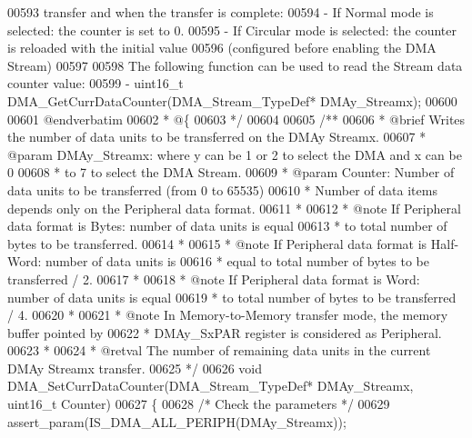 \begin{DoxyCode}
00593 \textcolor{comment}{  transfer and when the transfer is complete: }
00594 \textcolor{comment}{   - If Normal mode is selected: the counter is set to 0.}
00595 \textcolor{comment}{   - If Circular mode is selected: the counter is reloaded with the initial value}
00596 \textcolor{comment}{     (configured before enabling the DMA Stream)}
00597 \textcolor{comment}{   }
00598 \textcolor{comment}{  The following function can be used to read the Stream data counter value:}
00599 \textcolor{comment}{     - uint16\_t DMA\_GetCurrDataCounter(DMA\_Stream\_TypeDef* DMAy\_Streamx);}
00600 \textcolor{comment}{}
00601 \textcolor{comment}{@endverbatim}
00602 \textcolor{comment}{  * @\{}
00603 \textcolor{comment}{  */}
00604 
00605 \textcolor{comment}{/**}
00606 \textcolor{comment}{  * @brief  Writes the number of data units to be transferred on the DMAy Streamx.}
00607 \textcolor{comment}{  * @param  DMAy\_Streamx: where y can be 1 or 2 to select the DMA and x can be 0}
00608 \textcolor{comment}{  *          to 7 to select the DMA Stream.}
00609 \textcolor{comment}{  * @param  Counter: Number of data units to be transferred (from 0 to 65535) }
00610 \textcolor{comment}{  *          Number of data items depends only on the Peripheral data format.}
00611 \textcolor{comment}{  *            }
00612 \textcolor{comment}{  * @note   If Peripheral data format is Bytes: number of data units is equal }
00613 \textcolor{comment}{  *         to total number of bytes to be transferred.}
00614 \textcolor{comment}{  *           }
00615 \textcolor{comment}{  * @note   If Peripheral data format is Half-Word: number of data units is  }
00616 \textcolor{comment}{  *         equal to total number of bytes to be transferred / 2.}
00617 \textcolor{comment}{  *           }
00618 \textcolor{comment}{  * @note   If Peripheral data format is Word: number of data units is equal }
00619 \textcolor{comment}{  *         to total  number of bytes to be transferred / 4.}
00620 \textcolor{comment}{  *      }
00621 \textcolor{comment}{  * @note   In Memory-to-Memory transfer mode, the memory buffer pointed by }
00622 \textcolor{comment}{  *         DMAy\_SxPAR register is considered as Peripheral.}
00623 \textcolor{comment}{  *      }
00624 \textcolor{comment}{  * @retval The number of remaining data units in the current DMAy Streamx transfer.}
00625 \textcolor{comment}{  */}
00626 \textcolor{keywordtype}{void} DMA_SetCurrDataCounter(DMA\_Stream\_TypeDef* DMAy\_Streamx, uint16\_t Counter)
00627 \{
00628   \textcolor{comment}{/* Check the parameters */}
00629   assert_param(IS\_DMA\_ALL\_PERIPH(DMAy\_Streamx));

\end{DoxyCode}
